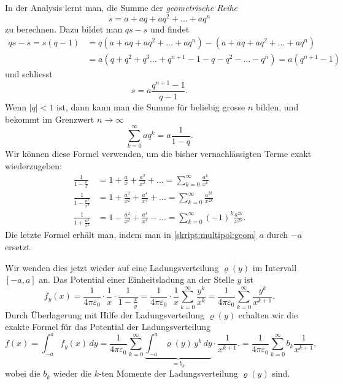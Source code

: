 In der Analysis lernt man, die Summe der {\em geometrische Reihe}
\[
s=a+aq+aq^2+\dots + aq^n
\]
zu berechnen.
Dazu bildet man $qs - s$ und findet
\begin{align*}
qs-s
=
s(q-1)
&=
q(a+aq+aq^2+\dots + aq^n)-(a+aq+aq^2+\dots + aq^n)
\\
&=
a(q+q^2+q^3\dots+q^{n+1}-1-q-q^2-\dots-q^n)
=
a(q^{n+1}-1)
\end{align*}
und schliesst
\[
s=a\frac{q^{n+1}-1}{q-1}.
\]
Wenn $|q|<1$ ist, dann kann man die Summe für beliebig grosse $n$ bilden,
und bekommt im Grenzwert $n\to\infty$
\begin{equation}
\sum_{k=0}^\infty aq^k = a\frac{1}{1-q}.
\label{skript:multipol:geom}
\end{equation}
Wir können diese Formel verwenden, um die bisher vernachlässigten Terme
exakt wiederzugeben:
\begin{align*}
\frac{1}{1-\displaystyle\frac{a}{x}}
&=
1+\frac{a}{x}+\frac{a^2}{x^2}+\dots
=
\sum_{k=0}^\infty \frac{a^k}{x^k}
\\
\frac{1}{1-\displaystyle\frac{a^2}{x^2}}
&=
1+\frac{a^2}{x^2}+\frac{a^4}{x^4}+\dots
=
\sum_{k=0}^\infty \frac{a^{2k}}{x^{2k}}
\\
\frac{1}{1+\displaystyle\frac{a^2}{x^2}}
&=
1-\frac{a^2}{x^2}+\frac{a^4}{x^4}-\dots
=
\sum_{k=0}^\infty (-1)^k\frac{a^{2k}}{x^{2k}}.
\end{align*}
Die letzte Formel erhält man, indem man in \eqref{skript:multipol:geom}
$a$ durch $-a$ ersetzt.

Wir wenden dies jetzt wieder auf eine Ladungsverteilung
$\varrho(y)$ im Intervall $[-a,a]$ an.
Das Potential einer Einheitsladung an der Stelle $y$ ist
\[
f_y(x)
=
\frac1{4\pi\varepsilon_0}\cdot \frac{1}{x}\cdot\frac{1}{1-\displaystyle\frac{x}{y}}
=
\frac1{4\pi\varepsilon_0}\cdot \frac{1}{x}
\sum_{k=0}^\infty \frac{y^k}{x^k}
=
\frac1{4\pi\varepsilon_0}
\sum_{k=0}^\infty \frac{y^k}{x^{k+1}}.
\]
Durch Überlagerung mit Hilfe der Ladungsverteilung $\varrho(y)$ 
erhalten wir die exakte Formel für das Potential der Ladungsverteilung
\begin{equation}
f(x)
=
\int_{-a}^af_y(x)\,dy
=
\frac{1}{4\pi\varepsilon_0}
\sum_{k=0}^\infty
\underbrace{\int_{-a}^a\varrho(y)\,y^k\,dy}_{\displaystyle =b_k}
\cdot\frac{1}{x^{k+1}}.
=
\frac{1}{4\pi\varepsilon_0}
\sum_{k=0}^\infty b_k\frac{1}{x^{k+1}},
\label{skript:multipol:reiheexakte}
\end{equation}
wobei die $b_k$ wieder die $k$-ten Momente der Ladungsverteilung
$\varrho(y)$ sind.

